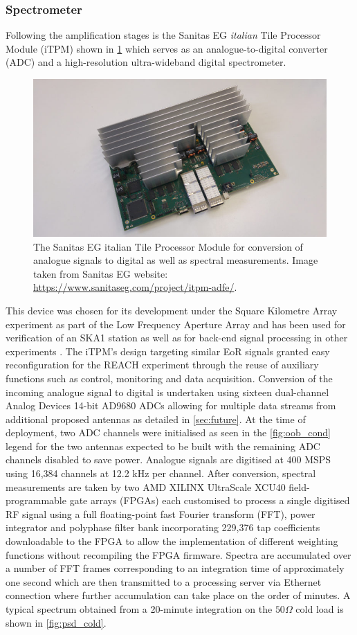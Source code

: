 \subsubsection{Spectrometer}
Following the amplification stages is the Sanitas EG \textit{italian} Tile Processor Module (iTPM) shown in \cref{fig:tpm} which serves as an analogue-to-digital converter (ADC) and a high-resolution ultra-wideband digital spectrometer.
\begin{figure}
    \centering
    \includegraphics[scale=0.4]{tpm}
    \caption{The Sanitas EG italian Tile Processor Module for conversion of analogue signals to digital as well as spectral measurements. Image taken from Sanitas EG website: \url{https://www.sanitaseg.com/project/itpm-adfe/}.}
    \label{fig:tpm}
\end{figure}
This device was chosen for its development under the Square Kilometre Array experiment as part of the Low Frequency Aperture Array and has been used for verification of an SKA1 station as well as for back-end signal processing in other experiments \citep{itpm}. The iTPM's design targeting similar EoR signals granted easy reconfiguration for the REACH experiment through the reuse of auxiliary functions such as control, monitoring and data acquisition. Conversion of the incoming analogue signal to digital is undertaken using sixteen dual-channel Analog Devices 14-bit AD9680 ADCs allowing for multiple data streams from additional proposed antennas as detailed in \cref{sec:future}. At the time of deployment, two ADC channels were initialised as seen in the \cref{fig:oob_cond} legend for the two antennas expected to be built with the remaining ADC channels disabled to save power. Analogue signals are digitised at 400 MSPS using 16,384 channels at 12.2 kHz per channel. After conversion, spectral measurements are taken by two AMD XILINX UltraScale XCU40 field-programmable gate arrays (FPGAs) each customised to process a single digitised RF signal using a full floating-point fast Fourier transform (FFT), power integrator and polyphase filter bank incorporating 229,376 tap coefficients downloadable to the FPGA to allow the implementation of different weighting functions without recompiling the FPGA firmware. Spectra are accumulated over a number of FFT frames corresponding to an integration time of approximately one second which are then transmitted to a processing server via Ethernet connection where further accumulation can take place on the order of minutes. A typical spectrum obtained from a 20-minute integration on the $50 \Omega$ cold load is shown in \cref{fig:psd_cold}.
